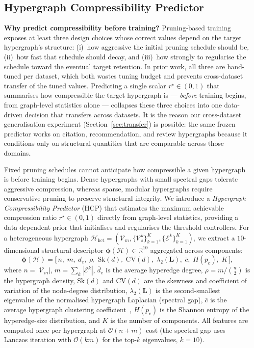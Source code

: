 \documentclass[10pt]{article}
\theoremstyle{plain}
\theoremstyle{definition}
\begin{document}
\subsection{Hypergraph Compressibility Predictor}
\label{sec:hcp}

\textbf{Why predict compressibility before training?} Pruning-based training exposes at least three design choices whose correct values depend on the target hypergraph's structure: (i)~how aggressive the initial pruning schedule should be, (ii)~how fast that schedule should decay, and (iii)~how strongly to regularise the schedule toward the eventual target retention. In prior work, all three are hand-tuned per dataset, which both wastes tuning budget and prevents cross-dataset transfer of the tuned values. Predicting a single scalar $r^{\star}\!\in\!(0,1)$ that summarises how compressible the target hypergraph is --- \emph{before} training begins, from graph-level statistics alone --- collapses these three choices into one data-driven decision that transfers across datasets. It is the reason our cross-dataset generalisation experiment (Section~\ref{sec:transfer}) is possible: the same frozen predictor works on citation, recommendation, and review hypergraphs because it conditions only on structural quantities that are comparable across those domains.

Fixed pruning schedules cannot anticipate how compressible a given hypergraph is before training begins. Dense hypergraphs with small spectral gaps tolerate aggressive compression, whereas sparse, modular hypergraphs require conservative pruning to preserve structural integrity. We introduce a \emph{Hypergraph Compressibility Predictor} (HCP) that estimates the maximum achievable compression ratio $r^\star \in (0,1)$ directly from graph-level statistics, providing a data-dependent prior that initialises and regularises the threshold controllers. For a heterogeneous hypergraph $\mathcal{H}_{\mathrm{het}} = (\mathcal{V}_m,\{\mathcal{V}_s^k\}_{k=1}^K, \{\mathcal{E}^k\}_{k=1}^K)$, we extract a $10$-dimensional structural descriptor $\boldsymbol{\phi}(\mathcal{H}) \in \mathbb{R}^{10}$ aggregated across components:
\begin{equation}
\boldsymbol{\phi}(\mathcal{H}) =
\big[\,n,\; m,\; \bar{d}_e,\; \rho,\; \mathrm{Sk}(d),\;
       \mathrm{CV}(d),\; \lambda_2(\mathbf{L}),\; \bar{c},\;
       H(p_e),\; K\,\big],
\label{eq:hcp_features}
\end{equation}
where $n=|\mathcal{V}_m|$, $m=\sum_k|\mathcal{E}^k|$, $\bar{d}_e$ is the average hyperedge degree, $\rho = m/\binom{n}{2}$ is the hypergraph density, $\mathrm{Sk}(d)$ and $\mathrm{CV}(d)$ are the skewness and coefficient of variation of the node-degree distribution, $\lambda_2(\mathbf{L})$ is the second-smallest eigenvalue of the normalised hypergraph Laplacian (spectral gap), $\bar{c}$ is the average hypergraph clustering coefficient~\citep{estrada2006subgraph}, $H(p_e)$ is the Shannon entropy of the hyperedge-size distribution, and $K$ is the number of components. All features are computed once per hypergraph at $\mathcal{O}(n+m)$ cost (the spectral gap uses Lanczos iteration with $\mathcal{O}(km)$ for the top-$k$ eigenvalues, $k=10$).
\end{document}
